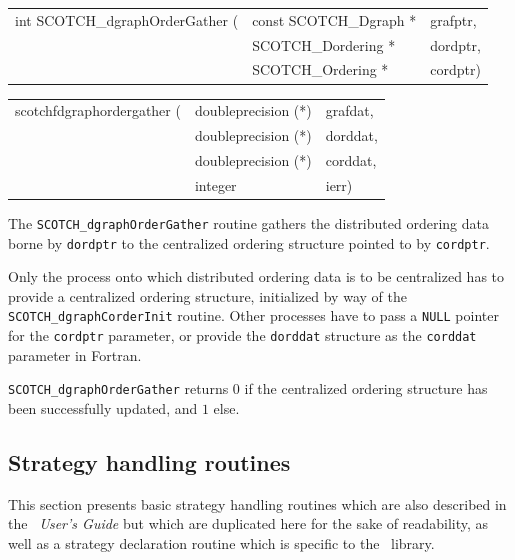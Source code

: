 \begin{itemize}
\progsyn

{\tt\begin{tabular}{l@{}ll}
int SCOTCH\_dgraphOrderGather ( & const SCOTCH\_Dgraph * & grafptr, \\
                                & SCOTCH\_Dordering *    & dordptr, \\
                                & SCOTCH\_Ordering *     & cordptr)
\end{tabular}}

{\tt\begin{tabular}{l@{}ll}
scotchfdgraphordergather ( & doubleprecision (*) & grafdat, \\
                           & doubleprecision (*) & dorddat, \\
                           & doubleprecision (*) & corddat, \\
                           & integer             & ierr)
\end{tabular}}

\progdes

The {\tt SCOTCH\_dgraph\lbt Order\lbt Gather} routine gathers the
distributed ordering data borne by {\tt dordptr} to the
centralized ordering structure pointed to by {\tt cordptr}.

Only the process onto which distributed ordering data is to be
centralized has to provide a centralized ordering structure,
initialized by way of the {\tt SCOTCH\_dgraph\lbt Corder\lbt Init}
routine. Other processes have to pass a \texttt{NULL} pointer for the
\texttt{cordptr} parameter, or provide the \texttt{dorddat} structure
as the \texttt{corddat} parameter in Fortran.

\progret

{\tt SCOTCH\_dgraphOrderGather} returns $0$ if the centralized
ordering structure has been successfully updated, and $1$ else.
\end{itemize}

\subsection{Strategy handling routines}
\label{sec-lib-func-strat}

This section presents basic strategy handling routines which are also
described in the {\it\scotch\ User's Guide} but which are duplicated
here for the sake of readability, as well as a strategy declaration
routine which is specific to the \ptscotch\ library.

